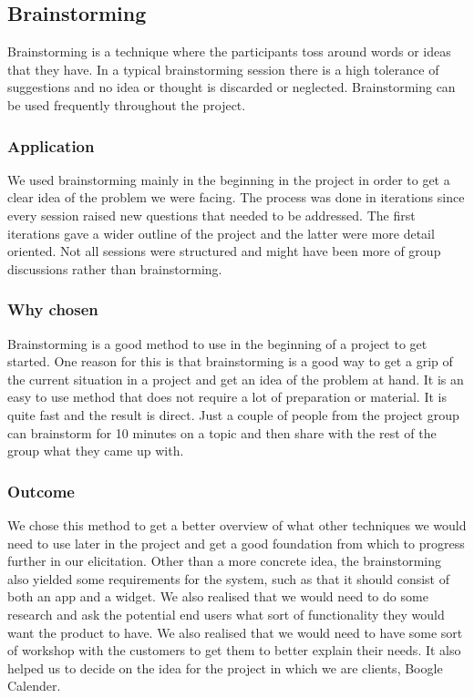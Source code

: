 \documentclass[a4paper]{article}
\begin{document}
	\subsection{Brainstorming}
Brainstorming is a technique where the participants toss around words or ideas that they have. In a typical brainstorming session there is a high tolerance of suggestions and no idea or thought is discarded or neglected. Brainstorming can be used frequently throughout the project.
		\subsubsection{Application}
We used brainstorming mainly in the beginning in the project in order to get a clear idea of the problem we were facing. The process was done in iterations since every session raised new questions that needed to be addressed. The first iterations gave a wider outline of the project and the latter were more detail oriented. Not all sessions were structured and might have been more of group discussions rather than brainstorming.
		\subsubsection{Why chosen}
Brainstorming is a good method to use in the beginning of a project to get started. One reason for this is that brainstorming is a good way to get a grip of the current situation in a project and get an idea of the problem at hand. It is an easy to use method that does not require a lot of preparation or material. It is quite fast and the result is direct. Just a couple of people from the project group can brainstorm for 10 minutes on a topic and then share with the rest of the group what they came up with. 

		\subsubsection{Outcome}
		 We chose this method to get a better overview of what other techniques we would need to use later in the project and get a good foundation from which to progress further in our elicitation. Other than a more concrete idea, the brainstorming also yielded some requirements for the system, such as that it should consist of both an app and a widget. We also realised that we would need to do some research and ask the potential end users what sort of functionality they would want the product to have. We also realised that we would need to have some sort of workshop with the customers to get them to better explain their needs. It also helped us to decide on the idea for the project in which we are clients, Boogle Calender.
\end{document}
